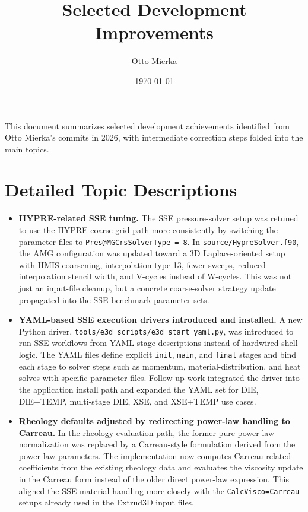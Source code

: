 \documentclass[11pt,a4paper]{article}
\title{Selected Development Improvements}
\author{Otto Mierka}
\date{\today}
\begin{document}
\maketitle

This document summarizes selected development achievements identified from Otto Mierka's commits in 2026, with intermediate correction steps folded into the main topics.

\section*{Detailed Topic Descriptions}
\begin{itemize}[leftmargin=*,itemsep=0.9em]
  \item \textbf{HYPRE-related SSE tuning.}
  The SSE pressure-solver setup was retuned to use the HYPRE coarse-grid path more consistently by switching the parameter files to \texttt{Pres@MGCrsSolverType = 8}. In \texttt{source/HypreSolver.f90}, the AMG configuration was updated toward a 3D Laplace-oriented setup with HMIS coarsening, interpolation type 13, fewer sweeps, reduced interpolation stencil width, and V-cycles instead of W-cycles. This was not just an input-file cleanup, but a concrete coarse-solver strategy update propagated into the SSE benchmark parameter sets.

  \item \textbf{YAML-based SSE execution drivers introduced and installed.}
  A new Python driver, \texttt{tools/e3d\_scripts/e3d\_start\_yaml.py}, was introduced to run SSE workflows from YAML stage descriptions instead of hardwired shell logic. The YAML files define explicit \texttt{init}, \texttt{main}, and \texttt{final} stages and bind each stage to solver steps such as momentum, material-distribution, and heat solves with specific parameter files. Follow-up work integrated the driver into the application install path and expanded the YAML set for DIE, DIE+TEMP, multi-stage DIE, XSE, and XSE+TEMP use cases.

  \item \textbf{Rheology defaults adjusted by redirecting power-law handling to Carreau.}
  In the rheology evaluation path, the former pure power-law normalization was replaced by a Carreau-style formulation derived from the power-law parameters. The implementation now computes Carreau-related coefficients from the existing rheology data and evaluates the viscosity update in the Carreau form instead of the older direct power-law expression. This aligned the SSE material handling more closely with the \texttt{CalcVisco=Carreau} setups already used in the Extrud3D input files.


\end{itemize}
\end{document}
